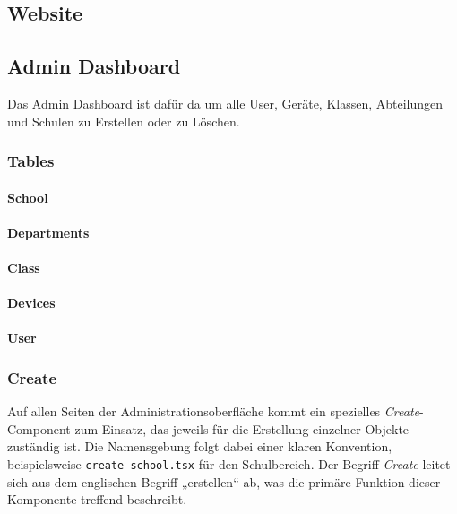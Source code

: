 \begin{inhalt}
\renewcommand*\chapterpagestyle{scrheadings}
\chapter{Website}

\section{Admin Dashboard}

Das Admin Dashboard ist dafür da um alle User, Geräte, Klassen, Abteilungen und Schulen zu Erstellen oder zu Löschen. 

\subsection{Tables}

\subsubsection{School}

\subsubsection{Departments}

\subsubsection{Class}

\subsubsection{Devices}

\subsubsection{User}

\subsection{Create}

Auf allen Seiten der Administrationsoberfläche kommt ein spezielles \emph{Create}-Component zum Einsatz, das jeweils für die Erstellung einzelner Objekte zuständig ist. Die Namensgebung folgt dabei einer klaren Konvention, beispielsweise \texttt{create-school.tsx} für den Schulbereich. Der Begriff \emph{Create} leitet sich aus dem englischen Begriff „erstellen“ ab, was die primäre Funktion dieser Komponente treffend beschreibt.


\end{inhalt}
